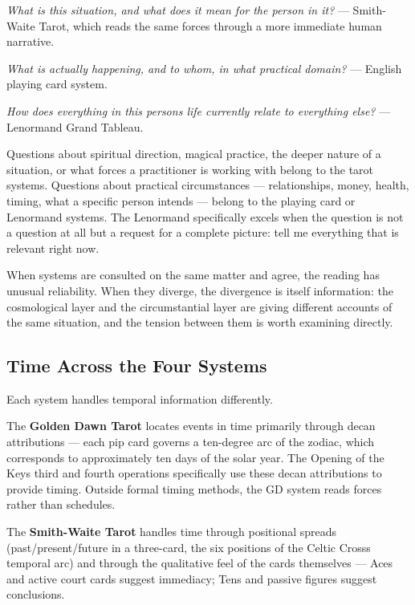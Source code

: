 \emph{What is this situation, and what does it mean for the person in it?} --- Smith-Waite Tarot, which reads the same forces through a more immediate human narrative.

\emph{What is actually happening, and to whom, in what practical domain?} --- English playing card system.

\emph{How does everything in this person\textquotesingle s life currently relate to everything else?} --- Lenormand Grand Tableau.

Questions about spiritual direction, magical practice, the deeper nature of a situation, or what forces a practitioner is working with belong to the tarot systems. Questions about practical circumstances --- relationships, money, health, timing, what a specific person intends --- belong to the playing card or Lenormand systems. The Lenormand specifically excels when the question is not a question at all but a request for a complete picture: tell me everything that is relevant right now.

When systems are consulted on the same matter and agree, the reading has unusual reliability. When they diverge, the divergence is itself information: the cosmological layer and the circumstantial layer are giving different accounts of the same situation, and the tension between them is worth examining directly.

\subsection{Time Across the Four Systems}\label{time-across-the-four-systems}

Each system handles temporal information differently.

The \textbf{Golden Dawn Tarot} locates events in time primarily through decan attributions --- each pip card governs a ten-degree arc of the zodiac, which corresponds to approximately ten days of the solar year. The Opening of the Key\textquotesingle s third and fourth operations specifically use these decan attributions to provide timing. Outside formal timing methods, the GD system reads forces rather than schedules.

The \textbf{Smith-Waite Tarot} handles time through positional spreads (past/present/future in a three-card, the six positions of the Celtic Cross\textquotesingle s temporal arc) and through the qualitative feel of the cards themselves --- Aces and active court cards suggest immediacy; Tens and passive figures suggest conclusions.

